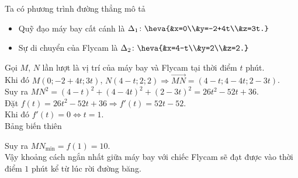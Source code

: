 \begin{ex}
{\begin{itemchoice}
			\itemch Ta có phương trình đường thẳng mô tả
			\begin{itemize}
				\item Quỹ đạo máy bay cất cánh là $\Delta_1\colon\heva{&x=0\\&y=-2+4t\\&z=3t.}$
				\item Sự di chuyển của Flycam là $\Delta_2\colon\heva{&x=4-t\\&y=2\\&z=2.}$
			\end{itemize}
			Gọi $M$, $N$ lần lượt là vị trí của máy bay và Flycam tại thời điểm $t$ phút.\\
			Khi đó $M(0;-2+4t;3t)$, $N(4-t;2;2)\Rightarrow \overrightarrow{MN}=(4-t;4-4t;2-3t)$.\\
			Suy ra $MN^2=(4-t)^2+(4-4t)^2+(2-3t)^2=26t^2-52t+36$.\\
			Đặt $f(t)=26t^2-52t+36\Rightarrow f'(t)=52t-52$.\\
			Khi đó $f'(t)=0\Leftrightarrow t=1$.\\
			Bảng biến thiên
			\begin{center}
			\end{center}
			Suy ra $MN_{\text{min}}=f(1)=10$.\\
			Vậy khoảng cách ngắn nhất giữa máy bay với chiếc Flycam sẽ đạt được vào thời điểm $1$ phút kể từ lúc rời đường băng.
		\end{itemchoice}
	}
\end{ex}

